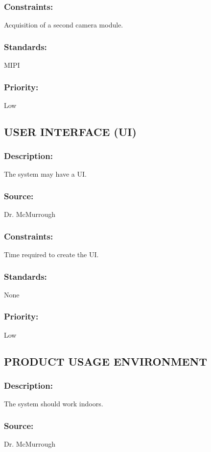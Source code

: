 \subsubsection{Constraints:} 
	{Acquisition of a second camera module.}
\subsubsection{Standards:} 
	{MIPI}
\subsubsection{Priority:} 
	{Low}
\newline
	
\subsection{\text USER INTERFACE (UI)}
\subsubsection{Description:} 
	{The system may have a UI.} 
\subsubsection{Source:} 
	{Dr. McMurrough}
\subsubsection{Constraints:} 
	{Time required to create the UI.}
\subsubsection{Standards:} 
	{None}
\subsubsection{Priority:} 
	{Low}
\newline
	
\subsection{\text PRODUCT USAGE ENVIRONMENT}
\subsubsection{Description:} 
	{The system should work indoors.}
\subsubsection{Source:} 
	{Dr. McMurrough}
